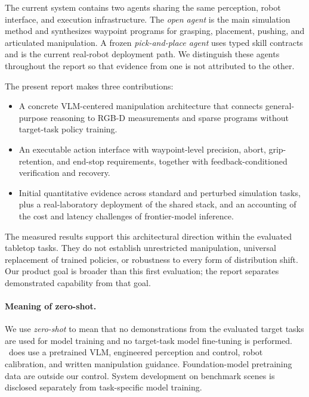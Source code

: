 The current system contains two agents sharing the same perception, robot interface, and execution infrastructure. The \emph{open agent} is the main simulation method and synthesizes waypoint programs for grasping, placement, pushing, and articulated manipulation. A frozen \emph{pick-and-place agent} uses typed skill contracts and is the current real-robot deployment path. We distinguish these agents throughout the report so that evidence from one is not attributed to the other.

The present report makes three contributions:
\begin{itemize}
\item A concrete VLM-centered manipulation architecture that connects general-purpose reasoning to RGB-D measurements and sparse programs without target-task policy training.
\item An executable action interface with waypoint-level precision, abort, grip-retention, and end-stop requirements, together with feedback-conditioned verification and recovery.
\item Initial quantitative evidence across standard and perturbed simulation tasks, plus a real-laboratory deployment of the shared stack, and an accounting of the cost and latency challenges of frontier-model inference.
\end{itemize}

The measured results support this architectural direction within the evaluated tabletop tasks. They do not establish unrestricted manipulation, universal replacement of trained policies, or robustness to every form of distribution shift. Our product goal is broader than this first evaluation; the report separates demonstrated capability from that goal.

\paragraph{Meaning of zero-shot.}
We use \emph{zero-shot} to mean that no demonstrations from the evaluated target tasks are used for model training and no target-task model fine-tuning is performed. \zyra\ does use a pretrained VLM, engineered perception and control, robot calibration, and written manipulation guidance. Foundation-model pretraining data are outside our control. System development on benchmark scenes is disclosed separately from task-specific model training.

